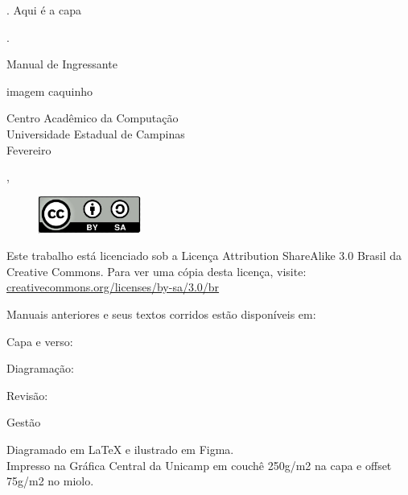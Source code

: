 .
\vfill
{\Huge Aqui é a capa}
\vfill
\thispagestyle{empty}\cleardoublepage

{\color{white}.}
\vfill
\begin{center}
    {\color{darkgray}\bfFont\fontsize{35}{35}\selectfont Manual de Ingressante}

    \vspace{3em}
    {imagem caquinho}
    \vspace{3em}

    \vfill
    {\color{darkgray}\generalFont\normalsize\selectfont Centro Acadêmico da Computação \\ Universidade Estadual de Campinas \\
    \vspace{1em}
    Fevereiro \ano
    \vspace{1em}
    \begin{tags}  \sep {}\end{tags}
    }
    \vspace{3em}

\end{center}
\vfill
\thispagestyle{empty}\cleardoublepage

\begin{center}
    \begin{figure}[h]
        \centering
        \includegraphics[width=0.3\textwidth]{_adendos/CC-BY-SA.jpg}
    \end{figure}    

    \vfill
    {\color{darkgray}\generalFont\normalsize\selectfont
    
    Este trabalho está licenciado sob a Licença Attribution ShareAlike 3.0 Brasil da Creative Commons. Para ver uma cópia desta licença, visite: \href{https://creativecommons.org/licenses/by-sa/3.0/br}{creativecommons.org/licenses/by-sa/3.0/br}
    
    \vfill
    Manuais anteriores e seus textos corridos estão disponíveis em: 

    \vfill
    Capa e verso: \\
    \autoresCapa

    \vfill
    Diagramação: \\
    \autoresDiagramacao

    \vfill
    Revisão: \\
    \autoresRevisao

    \vfill
    Gestão \gestao

    \vfill
    Diagramado em LaTeX e ilustrado em Figma. \\
    \vfill
    Impresso na Gráfica Central da Unicamp em couchê 250g/m2 na capa e offset 75g/m2 no miolo.
    }
\end{center}
\thispagestyle{empty}\cleardoublepage


